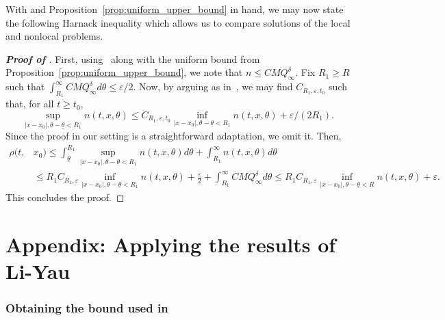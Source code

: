 \documentclass[11pt]{article}    %
\renewcommand{\epsilon}{\varepsilon}
\begin{document}
With  and Proposition~\ref{prop:uniform_upper_bound} in hand, we may now state the following Harnack inequality which allows us to compare solutions of the local and nonlocal problems.
\begin{proof}[{\bf Proof of }]
First, using~ along with the uniform bound from Proposition~\ref{prop:uniform_upper_bound}, we note that $n \leq CMQ_\infty^\delta$.  Fix $R_1 \geq R$ such that $\int_{R_1}^\infty CMQ_\infty^\delta d\theta\leq \epsilon/2$.  Now, by arguing as in~\cite[Theorem~2.6]{AlfaroBerestyckiRaoul}, we may find $C_{R_1,\epsilon,t_0}$ such that, for all $t\geq t_0$,
\[
	\sup_{|x-x_0|, \theta-\underline\theta < R_1} n(t,x,\theta)
		\leq C_{R_1,\epsilon,t_0} \inf_{|x-x_0|, \theta-\underline\theta < R_1} n(t,x,\theta) + \epsilon/(2R_1).
\]
Since the proof in our setting is a straightforward adaptation, we omit it.  Then,
\[\begin{split}
	\rho(t,&x_0) \leq \int_{\underline\theta}^{R_1} \sup_{|x-x_0|, \theta - \underline\theta < R_1} n(t,x,\theta)d\theta + \int_{R_1}^\infty n(t,x,\theta) d\theta\\
		&\leq R_1 C_{R_1,\epsilon} \inf_{|x-x_0|, \theta-\underline\theta < R_1} n(t,x,\theta) + \frac{\epsilon}{2} + \int_{R_1}^\infty CMQ_\infty^\delta d\theta
		\leq R_1 C_{R_1,\epsilon} \inf_{|x-x_0|, \theta-\underline\theta < R} n(t,x,\theta) + \epsilon.
\end{split}\]
This concludes the proof.
\end{proof}






\appendix


\section{Appendix: Applying the results of Li-Yau}\label{sec:appendix}


\subsubsection*{Obtaining the bound used in~}
\end{document}
